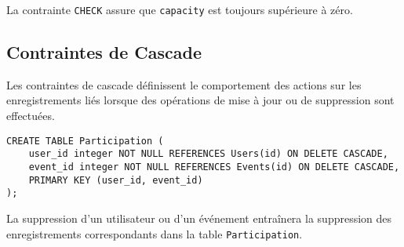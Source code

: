 La contrainte \texttt{CHECK} assure que \texttt{capacity} est toujours supérieure à zéro.

\subsection*{Contraintes de Cascade}

Les contraintes de cascade définissent le comportement des actions sur les enregistrements liés lorsque des opérations de mise à jour ou de suppression sont effectuées.

\begin{lstlisting}
CREATE TABLE Participation (
    user_id integer NOT NULL REFERENCES Users(id) ON DELETE CASCADE,
    event_id integer NOT NULL REFERENCES Events(id) ON DELETE CASCADE,
    PRIMARY KEY (user_id, event_id)
);
\end{lstlisting}

La suppression d'un utilisateur ou d'un événement entraînera la suppression des enregistrements correspondants dans la table \texttt{Participation}.